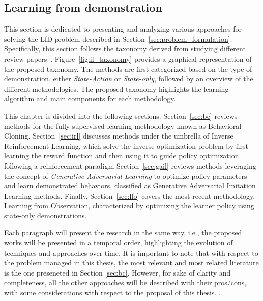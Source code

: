 \subsection{Learning from demonstration}
\label{sec:lfd}
This section is dedicated to presenting and analyzing various approaches for solving the LfD problem described in Section~\ref{sec:problem_formulation}. Specifically, this section follows the taxonomy derived from studying different review papers~\cite{kaelbling1996reinforcement_survey,argall2009robot_learning_from_demonstration,hussein2017imitation_learning_survey,fang2019survey,zheng2021imitation_progress_taxonomies_opportunities,zare2024survey}. Figure~\ref{fig:il_taxonomy} provides a graphical representation of the proposed taxonomy. The methods are first categorized based on the type of demonstration, either \textit{State-Action} or \textit{State-only}, followed by an overview of the different methodologies. The proposed taxonomy highlights the learning algorithm and main components for each methodology.

This chapter is divided into the following sections. Section~\ref{sec:bc} reviews methods for the fully-supervised learning methodology known as Behavioral Cloning. 
\newline Section~\ref{sec:irl} discusses methods under the umbrella of Inverse Reinforcement Learning, which solve the inverse optimization problem by first learning the reward function and then using it to guide policy optimization following a reinforcement paradigm
\newline Section~\ref{sec:gail} reviews methods leveraging the concept of \textit{Generative Adversarial Learning} to optimize policy parameters and learn demonstrated behaviors, classified as Generative Adversarial Imitation Learning methods.
\newline Finally, Section~\ref{sec:lfo} covers the most recent methodology, Learning from Observation, characterized by optimizing the learner policy using state-only demonstrations.

Each paragraph will present the research in the same way, i.e., the proposed works will be presented in a temporal order, highlighting the evolution of techniques and approaches over time.
It is important to note that with respect to the problem managed in this thesis, the most relevant and most related literature is the one preseneted in Section \ref{sec:bc}. However, for sake of clarity and completeness, all the other approaches will be described with their pros/cons, with some considerations with respect to the proposal of this thesis. .











